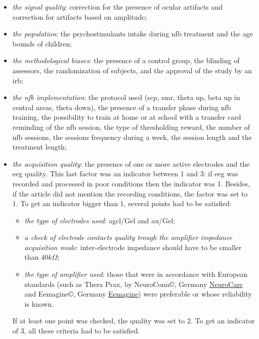 \begin{itemize}
\item \emph{the signal quality}: correction for the presence of ocular artifacts and correction for artifacts based on amplitude; 
\item \emph{the population}: the psychostimulants intake during \gls{nfb} treatment and the age bounds of children;
\item \emph{the methodological biases}: the presence of a control group, the blinding of assessors, 
the randomization of subjects, and the approval of the study by an \gls{irb};
\item \emph{the \gls{nfb} implementation}: the protocol used (\gls{scp}, \gls{smr}, 
theta up, beta up in central areas, theta down), the presence of a transfer phase during \gls{nfb} training, the possibility to train at home 
or at school with a transfer card reminding of the \gls{nfb} session, 
the type of thresholding reward, the number of \gls{nfb} sessions, the sessions frequency during a week, the session length and the treatment length;
\item \emph{the acquisition quality}: the presence of one or more active electrodes and the \gls{eeg} quality. 
This last factor was an indicator between 1 and 3: if \gls{eeg} was recorded and processed in poor conditions then the indicator was 1. 
Besides, if the article did not mention the recording conditions, the factor was set to 1. To get an indicator bigger than 1, several 
points had to be satisfied:
\begin{itemize}
  \item \emph{the type of electrodes used}: \gls{agcl}/Gel and \gls{au}/Gel;
  \item \emph{a check of electrode contacts quality trough the amplifier impedance acquisition mode}: inter-electrode impedance should have to be smaller than $40k\Omega$;  
  \item \emph{the type of amplifier used}: those that were in accordance with European standards (such as Thera Prax\textregistered, by NeuroConn\copyright,
	Germany \href{https://www.neurocaregroup.com/neuroconn-thera-prax.html}{NeuroCare} and Eemagine\copyright, Germany \href{http://www.eemagine.com/}{Eemagine}) were preferable or 
	whose reliability is known.
\end{itemize}
If at least one point was checked, the quality was set to 2. To get an indicator of 3, all these criteria had to be satisfied.
\end{itemize}

